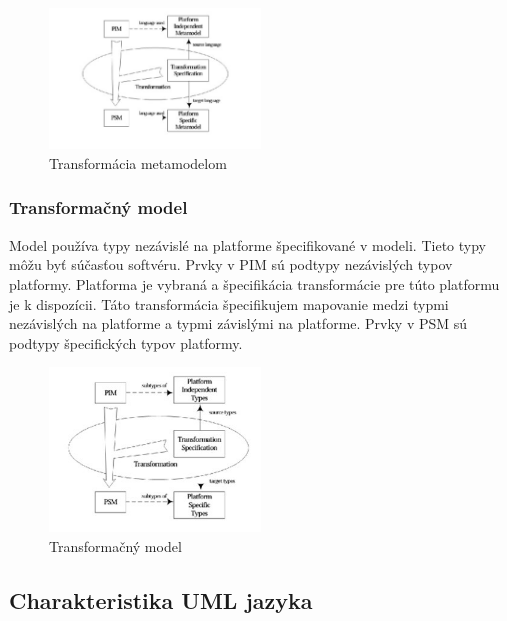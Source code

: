 \documentclass[a4paper]{feidippp}
\begin{document}
\begin{figure}[!ht]
\centering 
\includegraphics[width=0.5\textwidth]{dp2.jpg}
\caption{ Transformácia metamodelom}\label{o:1}
\end{figure}



\subsubsection{	Transformačný model } 


Model používa typy nezávislé na platforme špecifikované v modeli. Tieto typy môžu byť súčasťou softvéru. Prvky v PIM sú podtypy nezávislých typov platformy. Platforma je vybraná a špecifikácia transformácie pre túto platformu je k dispozícii. Táto transformácia špecifikujem mapovanie medzi typmi nezávislých na platforme a typmi závislými na platforme. Prvky v PSM sú podtypy špecifických typov platformy.

\begin{figure}[!ht]
\centering 
\includegraphics[width=0.5\textwidth]{dp3.jpg}
\caption{ Transformačný model}\label{o:1}
\end{figure}






\subsection{	Charakteristika UML jazyka}
\end{document}
